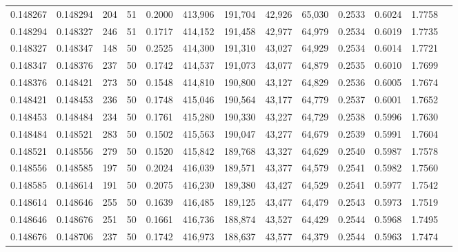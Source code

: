 \begin{tabular}{rrrrrrrrrrrrr}
0.148267 & 0.148294 &   204 &  51 &                                     0.2000 & 413,906 & 191,704 &  42,926 &  65,030 & 0.2533 & 0.6024 & 1.7758 \\
0.148294 & 0.148327 &   246 &  51 &                                     0.1717 & 414,152 & 191,458 &  42,977 &  64,979 & 0.2534 & 0.6019 & 1.7735 \\
0.148327 & 0.148347 &   148 &  50 &                                     0.2525 & 414,300 & 191,310 &  43,027 &  64,929 & 0.2534 & 0.6014 & 1.7721 \\
0.148347 & 0.148376 &   237 &  50 &                                     0.1742 & 414,537 & 191,073 &  43,077 &  64,879 & 0.2535 & 0.6010 & 1.7699 \\
0.148376 & 0.148421 &   273 &  50 &                                     0.1548 & 414,810 & 190,800 &  43,127 &  64,829 & 0.2536 & 0.6005 & 1.7674 \\
0.148421 & 0.148453 &   236 &  50 &                                     0.1748 & 415,046 & 190,564 &  43,177 &  64,779 & 0.2537 & 0.6001 & 1.7652 \\
0.148453 & 0.148484 &   234 &  50 &                                     0.1761 & 415,280 & 190,330 &  43,227 &  64,729 & 0.2538 & 0.5996 & 1.7630 \\
0.148484 & 0.148521 &   283 &  50 &                                     0.1502 & 415,563 & 190,047 &  43,277 &  64,679 & 0.2539 & 0.5991 & 1.7604 \\
0.148521 & 0.148556 &   279 &  50 &                                     0.1520 & 415,842 & 189,768 &  43,327 &  64,629 & 0.2540 & 0.5987 & 1.7578 \\
0.148556 & 0.148585 &   197 &  50 &                                     0.2024 & 416,039 & 189,571 &  43,377 &  64,579 & 0.2541 & 0.5982 & 1.7560 \\
0.148585 & 0.148614 &   191 &  50 &                                     0.2075 & 416,230 & 189,380 &  43,427 &  64,529 & 0.2541 & 0.5977 & 1.7542 \\
0.148614 & 0.148646 &   255 &  50 &                                     0.1639 & 416,485 & 189,125 &  43,477 &  64,479 & 0.2543 & 0.5973 & 1.7519 \\
0.148646 & 0.148676 &   251 &  50 &                                     0.1661 & 416,736 & 188,874 &  43,527 &  64,429 & 0.2544 & 0.5968 & 1.7495 \\
0.148676 & 0.148706 &   237 &  50 &                                     0.1742 & 416,973 & 188,637 &  43,577 &  64,379 & 0.2544 & 0.5963 & 1.7474 \\

\end{tabular}
